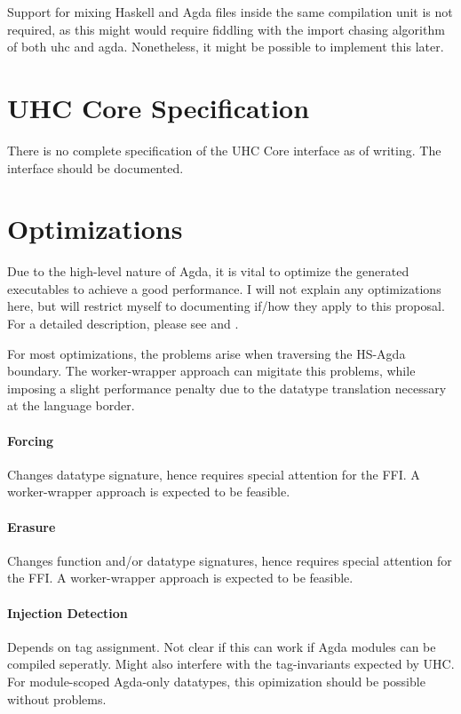 \documentclass[12pt, a4paper, twoside]{report}
\begin{document}
Support for mixing Haskell and Agda files inside the same compilation unit is not required, as this
might would require fiddling with the import chasing algorithm of both uhc and agda. Nonetheless,
it might be possible to implement this later.

\section{UHC Core Specification}
There is no complete specification of the UHC Core interface as of writing. The interface
should be documented.

\section{Optimizations}
Due to the high-level nature of Agda, it is vital to optimize the generated
executables to achieve a good performance. I will not explain any optimizations here,
but will restrict myself to documenting if/how they apply to this proposal.
For a detailed description, please see \cite{fredriksson2011totaly} and \cite{Brady-store-indices2004}.

For most optimizations, the problems arise when traversing the HS-Agda boundary. The worker-wrapper
approach can migitate this problems, while imposing a slight performance penalty due to the
datatype translation necessary at the language border.
\paragraph{Forcing}
Changes datatype signature, hence requires special attention for the FFI.
A worker-wrapper approach is expected to be feasible.

\paragraph{Erasure}
Changes function and/or datatype signatures, hence requires special attention for the FFI.
A worker-wrapper approach is expected to be feasible.

\paragraph{Injection Detection}
Depends on tag assignment. Not clear if this can work if Agda modules can be compiled
seperatly. Might also interfere with the tag-invariants expected by UHC.
For module-scoped Agda-only datatypes, this opimization should be possible without
problems.
\end{document}

